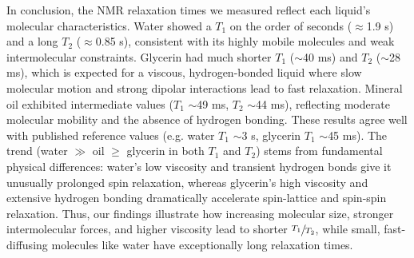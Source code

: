 \documentclass[
    floatfix,  %
    reprint,
    amsmath,
    amssymb,
    aps,
]{revtex4-2}
\begin{document}

In conclusion, the NMR relaxation times we measured reflect each liquid's molecular characteristics. Water showed a $T_1$ on the order of seconds ($\approx$1.9 s) and a long $T_2$ ($\approx$0.85 s), consistent with its highly mobile molecules and weak intermolecular constraints. Glycerin had much shorter $T_1$ ($\sim$40 ms) and $T_2$ ($\sim$28 ms), which is expected for a viscous, hydrogen-bonded liquid where slow molecular motion and strong dipolar interactions lead to fast relaxation. Mineral oil exhibited intermediate values ($T_1$ $\sim$49 ms, $T_2$ $\sim$44 ms), reflecting moderate molecular mobility and the absence of hydrogen bonding. These results agree well with published reference values (e.g. water $T_1$ $\sim$3 s, glycerin $T_1$ $\sim$45 ms). The trend (water $\gg$ oil $\geq$ glycerin in both $T_1$ and $T_2$) stems from fundamental physical differences: water's low viscosity and transient hydrogen bonds give it unusually prolonged spin relaxation, whereas glycerin's high viscosity and extensive hydrogen bonding dramatically accelerate spin-lattice and spin-spin relaxation. Thus, our findings illustrate how increasing molecular size, stronger intermolecular forces, and higher viscosity lead to shorter $\sfrac{T_1}{T_2}$, while small, fast-diffusing molecules like water have exceptionally long relaxation times.
\end{document}
